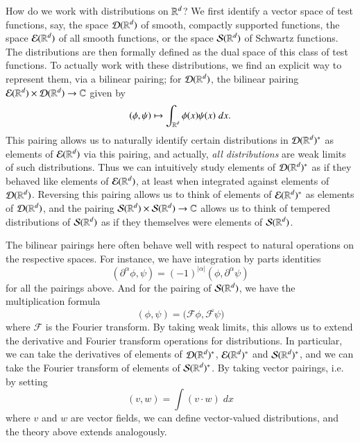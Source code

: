 How do we work with distributions on $\operatorname{\mathbb{R}}^d$? We first identify a vector space of test functions, say, the space $\operatorname{\mathcal{D}}(\operatorname{\mathbb{R}}^d)$ of smooth, compactly supported functions, the space $\operatorname{\mathcal{E}}(\operatorname{\mathbb{R}}^d)$ of all smooth functions, or the space $\operatorname{\mathcal{S}}(\operatorname{\mathbb{R}}^d)$ of Schwartz functions. The distributions are then formally defined as the dual space of this class of test functions. To actually work with these distributions, we find an explicit way to represent them, via a bilinear pairing; for $\operatorname{\mathcal{D}}(\operatorname{\mathbb{R}}^d)$, the bilinear pairing $\operatorname{\mathcal{E}}(\operatorname{\mathbb{R}}^d) \times \operatorname{\mathcal{D}}(\operatorname{\mathbb{R}}^d) \to \operatorname{\mathbb{C}}$ given by
%
\[ (\phi,\psi) \mapsto \int_{\operatorname{\mathbb{R}}^d} \phi(x) \psi(x)\; dx. \]
%
This pairing allows us to naturally identify certain distributions in $\operatorname{\mathcal{D}}(\operatorname{\mathbb{R}}^d)^*$ as elements of $\operatorname{\mathcal{E}}(\operatorname{\mathbb{R}}^d)$ via this pairing, and actually, \emph{all distributions} are weak limits of such distributions. Thus we can intuitively study elements of $\operatorname{\mathcal{D}}(\operatorname{\mathbb{R}}^d)^*$ as if they behaved like elements of $\operatorname{\mathcal{E}}(\operatorname{\mathbb{R}}^d)$, at least when integrated against elements of $\operatorname{\mathcal{D}}(\operatorname{\mathbb{R}}^d)$. Reversing this pairing allows us to think of elements of $\operatorname{\mathcal{E}}(\operatorname{\mathbb{R}}^d)^*$ as elements of $\operatorname{\mathcal{D}}(\operatorname{\mathbb{R}}^d)$, and the pairing $\operatorname{\mathcal{S}}(\operatorname{\mathbb{R}}^d) \times \operatorname{\mathcal{S}}(\operatorname{\mathbb{R}}^d) \to \operatorname{\mathbb{C}}$ allows us to think of tempered distributions of $\operatorname{\mathcal{S}}(\operatorname{\mathbb{R}}^d)$ as if they themselves were elements of $\operatorname{\mathcal{S}}(\operatorname{\mathbb{R}}^d)$.

The bilinear pairings here often behave well with respect to natural operations on the respective spaces. For instance, we have integration by parts identities
%
\[ ( \partial^\alpha \phi, \psi ) = (-1)^{|\alpha|} (\phi, \partial^\alpha \psi) \]
%
for all the pairings above. And for the pairing of $\operatorname{\mathcal{S}}(\operatorname{\mathbb{R}}^d)$, we have the multiplication formula
%
\[ ( \phi, \psi ) = \Big( \mathcal{F} \phi , \overline{\mathcal{F} \psi} \Big) \]
%
where $\mathcal{F}$ is the Fourier transform. By taking weak limits, this allows us to extend the derivative and Fourier transform operations for distributions. In particular, we can take the derivatives of elements of $\operatorname{\mathcal{D}}(\operatorname{\mathbb{R}}^d)^*$, $\operatorname{\mathcal{E}}(\operatorname{\mathbb{R}}^d)^*$ and $\operatorname{\mathcal{S}}(\operatorname{\mathbb{R}}^d)^*$, and we can take the Fourier transform of elements of $\operatorname{\mathcal{S}}(\operatorname{\mathbb{R}}^d)^*$. By taking vector pairings, i.e. by setting
%
\[ (v, w) = \int (v \cdot w)\; dx \]
%
where $v$ and $w$ are vector fields, we can define vector-valued distributions, and the theory above extends analogously.


